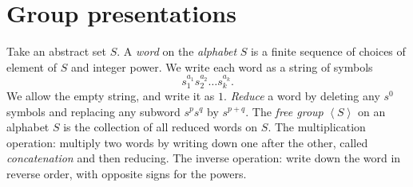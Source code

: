 \section{Group presentations}
Take an abstract set \(S\).
A \emph{word} on the \emph{alphabet} \(S\) is a finite sequence of choices of element of \(S\) and integer power.
We write each word as a string of symbols
\[
s_1^{a_1} s_2^{a_2} \dots s_k^{a_k}.
\]
We allow the empty string, and write it as \(1\).
\emph{Reduce} a word by deleting any \(s^0\) symbols and replacing any subword \(s^p s^q\) by \(s^{p+q}\).
The \emph{free group} \(\left<S\right>\) on an alphabet \(S\) is the collection of all reduced words on \(S\).
The multiplication operation: multiply two words by writing down one after the other, called \emph{concatenation} and then reducing.
The inverse operation: write down the word in reverse order, with opposite signs for the powers.

